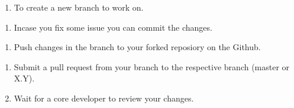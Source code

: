 \documentclass[letterpaper,10pt,english]{sphinxmanual}
\begin{document}
\begin{sphinxVerbatim}[commandchars=\\\{\}]
  
\end{sphinxVerbatim}
\begin{enumerate}
%
\setcounter{enumi}{7}
\item {} 
To create a new branch to work on.

\end{enumerate}

\begin{sphinxVerbatim}[commandchars=\\\{\}]
   
\end{sphinxVerbatim}
\begin{enumerate}
%
\setcounter{enumi}{8}
\item {} 
Incase you fix some issue you can commit the changes.

\end{enumerate}

\begin{sphinxVerbatim}[commandchars=\\\{\}]
   
\end{sphinxVerbatim}
\begin{enumerate}
%
\setcounter{enumi}{9}
\item {} 
Push changes in the branch to your forked reposiory on the Github.

\end{enumerate}

\begin{sphinxVerbatim}[commandchars=\\\{\}]
   
\end{sphinxVerbatim}
\begin{enumerate}
%
\setcounter{enumi}{10}
\item {} 
Submit a pull request from your branch to the respective branch (master or X.Y).

\item {} 
Wait for a core developer to review your changes.

\end{enumerate}
\end{document}
